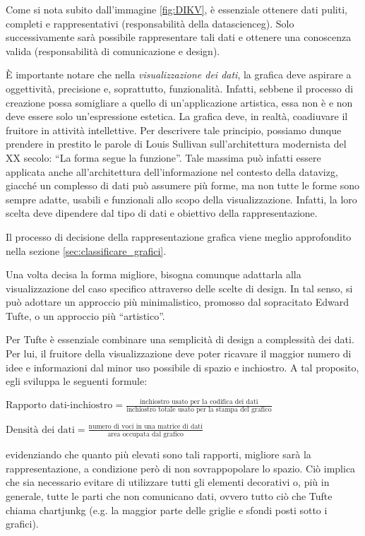 Come si nota subito dall'immagine \ref{fig:DIKV}, è essenziale ottenere dati puliti, completi e rappresentativi (responsabilità della \gls{datascienceg}). Solo successivamente sarà possibile rappresentare tali dati e 
ottenere una conoscenza valida (responsabilità di comunicazione e design).

\bigskip
\noindent È importante notare che nella \emph{visualizzazione dei dati}, la grafica deve aspirare a oggettività, precisione e, soprattutto, funzionalità. Infatti, sebbene il processo di creazione possa somigliare 
a quello di un'applicazione artistica, essa non è e non deve essere solo un'espressione estetica. La grafica deve, in realtà, coadiuvare il fruitore in attività intellettive.
Per descrivere tale principio, possiamo dunque prendere in prestito le parole di Louis Sullivan sull'architettura modernista del XX secolo: ``La forma segue la funzione''. 
Tale massima può infatti essere applicata anche all'architettura dell'informazione nel contesto della \gls{datavizg}, giacché
un complesso di dati può assumere più forme, ma non tutte le forme sono sempre adatte, usabili e funzionali allo scopo della visualizzazione. Infatti, la loro scelta deve dipendere dal
tipo di dati e obiettivo della rappresentazione.

Il processo di decisione della rappresentazione grafica viene meglio approfondito nella sezione \ref{sec:classificare_grafici}.

\bigskip
\noindent Una volta decisa la forma migliore, bisogna comunque adattarla alla visualizzazione del caso specifico attraverso delle scelte di design.
In tal senso, si può adottare un approccio più minimalistico, promosso dal sopracitato Edward Tufte, o un approccio più ``artistico''.

Per Tufte è essenziale combinare una semplicità di design a complessità dei dati. Per lui, il fruitore della visualizzazione deve poter ricavare il maggior numero di idee e informazioni dal minor uso possibile di spazio e inchiostro.
A tal proposito, egli sviluppa le seguenti formule: 
\begin{center}
    $\text{Rapporto dati-inchiostro} = \frac{\text{inchiostro usato per la codifica dei dati}}{\text{inchiostro totale usato per la stampa del grafico}}$
\end{center}
\begin{center}
    $\text{Densità dei dati} = \frac{\text{numero di voci in una matrice di dati}}{\text{area occupata dal grafico}}$
\end{center}
evidenziando che quanto più elevati sono tali rapporti, migliore sarà la rappresentazione, a condizione però di non sovrappopolare lo spazio.
Ciò implica che sia necessario evitare di utilizzare tutti gli elementi decorativi o, più in generale, tutte le parti che non comunicano
dati, ovvero tutto ciò che Tufte chiama \gls{chartjunkg} (e.g. la maggior parte delle griglie e sfondi posti sotto i grafici).

